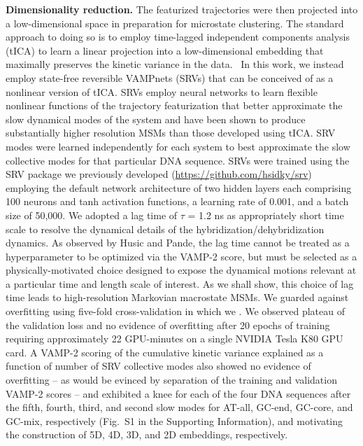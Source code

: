 \documentclass[journal=jpcbfk,manuscript=article]{achemso}
\newcommand*{\rood}[1]{{\color{red}{#1}}}
\newcommand*{\blauw}[1]{{#1}}
\begin{document}
\textbf{Dimensionality reduction.} The featurized trajectories were then projected into a low-dimensional space in preparation for microstate clustering. The standard approach to doing so is to employ time-lagged independent components analysis (tICA) to learn a linear projection into a low-dimensional embedding that maximally preserves the kinetic variance in the data.~\citep{Perez-Hernandez2013IdentificationConstruction, Schwantes2013ImprovementsNTL9, Noe2015KineticSimulation} In this work, we instead employ state-free reversible VAMPnets (SRVs) that can be conceived of as a nonlinear version of tICA. \citep{Chen} SRVs employ neural networks to learn flexible nonlinear functions of the trajectory featurization that better approximate the slow dynamical modes of the system and have been shown to produce substantially higher resolution MSMs than those developed using tICA.\citep{Chen, Sidky2019High-ResolutionVAMPnets} SRV modes were learned independently for each system to best approximate the slow collective modes for that particular DNA sequence. SRVs were trained using the SRV package we previously developed (\url{https://github.com/hsidky/srv}) employing the default network architecture of two hidden layers each comprising 100 neurons and tanh activation functions, a learning rate of 0.001, and a batch size of 50,000. We adopted a lag time of $\tau$ = 1.2 ns as appropriately short time scale to resolve the dynamical details of the hybridization/dehybridization dynamics. \citep{Phys2011MarkovValidation} As observed by Husic and Pande, the lag time cannot be treated as a hyperparameter to be optimized via the VAMP-2 score, but must be selected as a physically-motivated choice designed to expose the dynamical motions relevant at a particular time and length scale of interest. \citep{Husic2017Note:Selection} As we shall show, this choice of lag time leads to high-resolution Markovian macrostate MSMs. We guarded against overfitting using five-fold cross-validation in which we \rood{constructed five random partitions of the 40 independent simulation trajectories into a training set of 20 trajectories and a validation set of 20 trajectories}.\citep{Sidky2019High-ResolutionVAMPnets} We observed plateau of the validation loss and no evidence of overfitting after 20 epochs of training requiring approximately 22 GPU-minutes on a single NVIDIA Tesla K80 GPU card. A VAMP-2 scoring of the cumulative kinetic variance explained as a function of number of SRV collective modes also showed no evidence of overfitting -- as would be evinced by separation of the training and validation VAMP-2 scores \citep{Sidky2019High-ResolutionVAMPnets} -- and exhibited a knee for each of the four DNA sequences after the fifth, fourth, third, and second slow modes for AT-all, GC-end, GC-core, and GC-mix, respectively (\blauw{Fig.~S1} in the \blauw{Supporting Information}), and motivating the construction of 5D, 4D, 3D, and 2D embeddings, respectively.
\end{document}
